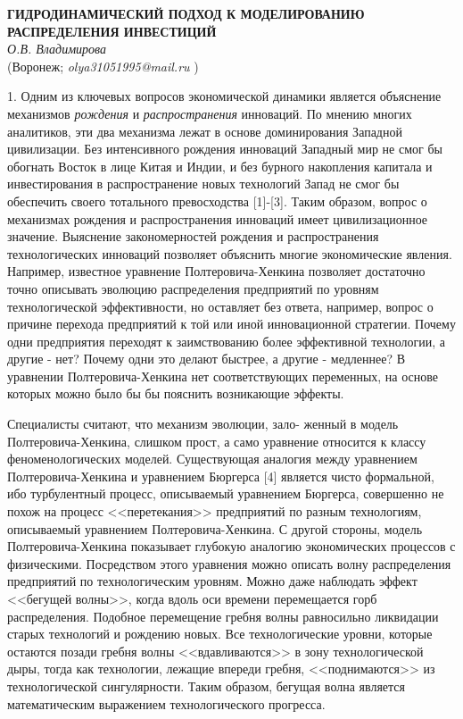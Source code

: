 \begin{center}{ \bf  ГИДРОДИНАМИЧЕСКИЙ
ПОДХОД К МОДЕЛИРОВАНИЮ РАСПРЕДЕЛЕНИЯ ИНВЕСТИЦИЙ}\\
{\it О.В. Владимирова} \\
(Воронеж; {\it olya31051995@mail.ru} )
\end{center}


1. Одним из ключевых вопросов экономической динамики является
объяснение механизмов {\em рождения} и {\em распространения}
инноваций. По мнению многих аналитиков, эти два механизма лежат в
основе доминирования Западной цивилизации. Без интенсивного рождения
инноваций Западный мир не смог бы обогнать Восток в лице Китая и
Индии, и без бурного накопления капитала и инвестирования в
распространение новых технологий Запад не смог бы обеспечить своего
тотального превосходства [1]-[3]. Таким образом, вопрос о механизмах
рождения и распространения инноваций имеет цивилизационное значение.
Выяснение закономерностей рождения и распространения технологических
инноваций позволяет объяснить многие экономические явления.
Например, известное уравнение Пол\-те\-ро\-ви\-ча-Хен\-ки\-на
позволяет достаточно точно описывать эволюцию распределения
предприятий по уровням технологической эффективности, но оставляет
без ответа, например, вопрос о причине перехода предприятий к той
или иной инновационной стратегии. Почему одни предприятия переходят
к заимствованию более эффективной технологии, а другие - нет? Почему
одни это делают быстрее, а другие - медленнее? В уравнении
Полте\-ро\-ви\-ча-Хен\-ки\-на нет соответствующих переменных, на
основе которых можно было бы бы пояснить возникающие эффекты.

Специалисты считают, что механизм эволюции, зало-
\linebreak
женный в модель
Полтеровича-Хенкина, слишком прост, а само уравнение относится к
классу феноменологических моделей. Существующая аналогия между
уравнением Пол\-те\-ро\-ви\-ча-Хен\-ки\-на и уравнением Бюргерса [4]
является чисто формальной, ибо турбулентный процесс, описываемый
уравнением Бюргерса, совершенно не похож на процесс <<перетекания>>
предприятий по разным технологиям, описываемый уравнением
Полтеровича-Хенкина. С другой стороны, модель
Полтеровича-Хен\-ки\-на показывает глубокую аналогию экономических
процессов с физическими. Посредством этого уравнения можно описать
волну распределения предприятий по технологическим уровням. Можно
даже наблюдать эффект <<бегущей волны>>, когда вдоль оси времени
перемещается горб распределения. Подобное перемещение гребня волны
равносильно ликвидации старых технологий и рождению новых. Все
технологические уровни, которые остаются позади гребня волны
<<вдавливаются>> в зону технологической дыры, тогда как технологии,
лежащие впереди гребня, <<поднимаются>> из технологической
сингулярности. Таким образом, бегущая волна является математическим
выражением технологического прогресса.

